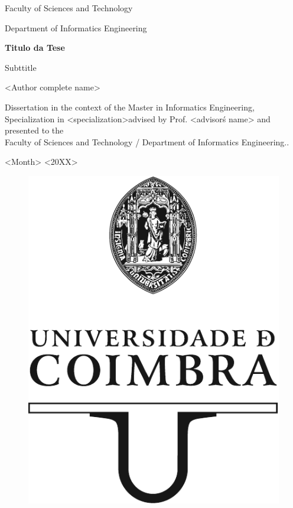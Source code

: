 

\begin{titlepage}
 

\begin{center}
\Large
Faculty of Sciences and Technology

Department of Informatics Engineering
\vspace{1cm}

\Huge
\textbf{\textup{\textsf{Titulo da Tese}}}

\LARGE

\textsf{Subttitle}

\vspace{3cm}

\Large
<Author complete name>

\vspace{3cm}

\normalsize

Dissertation in the context of the Master in Informatics Engineering, Specialization in <specialization>advised by Prof. <advisor\'s name> and presented to the \\
Faculty of Sciences and Technology / Department of Informatics Engineering..

\vspace{0.5cm}

<Month> <20XX>

\begin{figure}[b]
	\begin{center}
	\includegraphics[width=0.3\linewidth]{images/_UC_logo.pdf}
	\label{fig:Logo}	
	\end{center}
\end{figure}


\end{center}


\end{titlepage}
\restoregeometry
